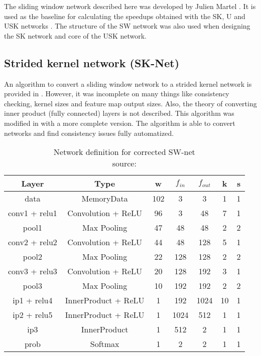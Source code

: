 The sliding window network described here was developed by Julien Martel \cite{Martel}. It is used as the baseline for calculating the speedups obtained with the SK, U and USK networks \cite{DBLP:journals/corr/Tschopp15}. The structure of the SW network was also used when designing the SK network and core of the USK network.
\subsection{Strided kernel network (SK-Net)}

An algorithm to convert a sliding window network to a strided kernel network is provided in \cite{DBLP:journals/corr/LiZW14}. However, it was incomplete on many things like consistency checking, kernel sizes and feature map output sizes. Also, the theory of converting inner product (fully connected) layers is not described. This algorithm was modified in \cite{DBLP:journals/corr/Tschopp15} with a more complete version. The algorithm is able to convert networks and find consistency issues fully automatized. 

\begin{table}
\begin{center}
  \begin{tabular}{ | c | c | c | c | c | c | c | }
    \hline
    Layer  &  Type  & w & $f_{in}$ & $f_{out}$ & k & s \\ \hline
   data & MemoryData & 102 & 3 & 3 & 1 & 1 \\ \hline 
   conv1 + relu1 & Convolution + ReLU & 96 & 3 & 48 & 7 & 1 \\ \hline
   pool1 & Max Pooling & 47 & 48 & 48 & 2 & 2 \\ \hline
   conv2 + relu2 & Convolution + ReLU & 44 & 48 & 128 & 5 & 1 \\ \hline
   pool2 & Max Pooling & 22 & 128 & 128 & 2 & 2 \\ \hline
   conv3 + relu3 & Convolution + ReLU & 20 & 128 & 192 & 3 & 1 \\ \hline
   pool3 & Max Pooling & 10 & 192 & 192 & 2 & 2 \\ \hline
   ip1 + relu4 & InnerProduct + ReLU & 1 & 192 & 1024 & 10 & 1 \\ \hline
   ip2 + relu5 & InnerProduct + ReLU & 1 & 1024 & 512 & 1 & 1 \\ \hline
   ip3  & InnerProduct & 1 & 512 & 2 & 1 & 1 \\ \hline
   prob & Softmax & 1 & 2 & 2 & 1 &1 \\ 
    \hline
  \end{tabular}
  \end{center}
  \caption{Network definition for corrected SW-net \\ source:\cite{DBLP:journals/corr/Tschopp15}}
  \label{table:def-sw2-net}
  \end{table}




